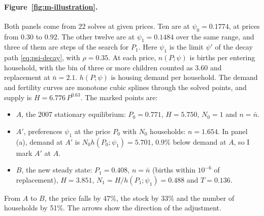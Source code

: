 \paragraph{Figure~\ref{fig:m-illustration}.} Both panels come from 22 solves at
given prices. Ten are at $\psi_0=0.1774$, at prices from 0.30 to 0.92. The
other twelve are at $\psi_1=0.1484$ over the same range, and three of them are
steps of the search for $P_1$. Here $\psi_1$ is the limit $\psi'$ of the
decay path \eqref{eq:psi-decay}, with $\rho=0.35$. At each price, $n(P;\psi)$ is births per entering household,
with the bin of three or more children counted as 3.60 and replacement at
$\bar n=2.1$. $h(P;\psi)$ is housing demand per household. The demand and
fertility curves are monotone cubic splines through the solved points, and
supply is $H=6.776\,P^{0.63}$. The marked points are:
\begin{itemize}
 \item $A$, the 2007 stationary equilibrium: $P_0=0.771$, $H=5.750$, $N_0=1$
 and $n=\bar n$.
 \item $A'$, preferences $\psi_1$ at the price $P_0$ with $N_0$ households:
 $n=1.654$. In panel (a), demand at $A'$ is $N_0h(P_0;\psi_1)=5.701$, 0.9\%
 below demand at $A$, so I mark $A'$ at $A$.
 \item $B$, the new steady state: $P_1=0.408$, $n=\bar n$ (births within
 $10^{-6}$ of replacement), $H=3.851$, $N_1=H/h(P_1;\psi_1)=0.488$ and
 $T=0.136$.
\end{itemize}
From $A$ to $B$, the price falls by 47\%, the stock by 33\% and the number of
households by 51\%. The arrows show the direction of the adjustment.

